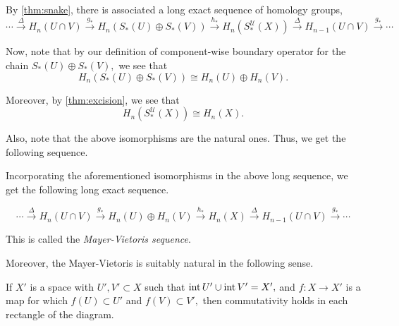\documentclass[12pt]{article}
\begin{document}
By \cref{thm:snake}, there is associated a long exact sequence of homology groups,
\begin{equation*} 
	\cdots\overset{\Delta}{\longrightarrow}H_n(U\cap V)\overset{g_*}{\longrightarrow}H_n(S_*(U) \oplus S_*(V))\overset{h_*}{\longrightarrow}H_{n}(S^{\mathcal{U}}_*(X))\overset{\Delta}{\longrightarrow}H_{n-1}(U\cap V)\overset{g_*}{\longrightarrow}\cdots
\end{equation*}

Now, note that by our definition of component-wise boundary operator for the chain $S_*(U) \oplus S_*(V),$ we see that
\begin{equation*} 
	H_n(S_*(U) \oplus S_*(V)) \cong H_n(U) \oplus H_n(V).
\end{equation*}

Moreover, by \cref{thm:excision}, we see that
\begin{equation*} 
	H_{n}(S^{\mathcal{U}}_*(X)) \cong H_n(X).
\end{equation*}

Also, note that the above isomorphisms are the natural ones. Thus, we get the following sequence.

\begin{defn}
	Incorporating the aforementioned isomorphisms in the above long sequence, we get the following long exact sequence.

	\begin{equation*} 
		\cdots\overset{\Delta}{\longrightarrow}H_n(U\cap V)\overset{g_*}{\longrightarrow} H_n(U) \oplus H_n(V)\overset{h_*}{\longrightarrow}H_{n}(X)\overset{\Delta}{\longrightarrow}H_{n-1}(U\cap V)\overset{g_*}{\longrightarrow}\cdots
	\end{equation*}

	This is called the \emph{Mayer-Vietoris sequence}.
\end{defn}

Moreover, the Mayer-Vietoris is suitably natural in the following sense.
\begin{prop} \label{prop:naturalmayviet}
	If $X'$ is a space with $U', V' \subset X$ such that $\operatorname{int} U' \cup \operatorname{int} V' = X',$ and $f:X\to X'$ is a map for which $f(U) \subset U'$ and $f(V) \subset V',$ then commutativity holds in each rectangle of the diagram.
	\begin{center}
	\end{center}
\end{prop}
\end{document}
